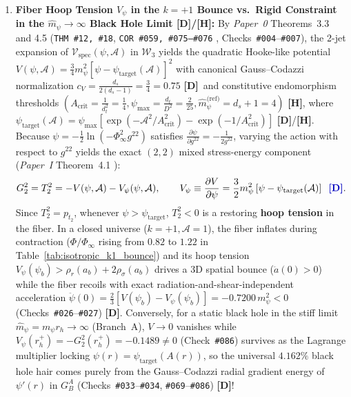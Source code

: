 \documentclass[11pt,a4paper]{article}
\newcommand{\catD}{\textbf{\textcolor{blue!75!black}{[D]}}}
\newcommand{\catH}{\textbf{\textcolor{orange!85!black}{[H]}}}
\theoremstyle{plain}
\theoremstyle{definition}
\theoremstyle{remark}
\numberwithin{equation}{section}
\begin{document}
\begin{enumerate}
  \item \textbf{Fiber Hoop Tension $V_{\psi}$ in the $k = +1$ Bounce vs.\ Rigid Constraint in the $\hat{m}_{\psi} \to \infty$ Black Hole Limit \catD/\catH:} By \textit{Paper~0} Theorems~3.3 and 4.5 (\texttt{THM \#12, \#18}, \texttt{COR \#059, \#075--\#076} \cite{jimenez2026_p0}, Checks~\texttt{\#004}--\texttt{\#007}), the 2-jet expansion of $\mathcal{V}_{\text{spec}}(\psi, \mathcal{A})$ in $\mathcal{W}_3$ yields the quadratic Hooke-like potential $V(\psi, \mathcal{A}) = \frac{3}{4}m_{\psi}^2[\psi - \psi_{\text{target}}(\mathcal{A})]^2$ with canonical Gauss--Codazzi normalization $c_V = \frac{d_s}{2(d_s-1)} = \frac{3}{4} = 0.75$ \catD\ and constitutive endomorphism thresholds $(A_{\text{crit}} = \frac{1}{d_t^2} = \frac{1}{4}, \psi_{\max} = \frac{d_t}{D^2} = \frac{2}{25}, \hat{m}_{\psi}^{\text{(ref)}} = d_s + 1 = 4)$ \catH, where $\psi_{\text{target}}(\mathcal{A}) = \psi_{\max}[\exp(-\mathcal{A}^2/A_{\text{crit}}^2) - \exp(-1/A_{\text{crit}}^2)]$ \catD/\catH. Because $\psi = -\frac{1}{2}\ln(-\Phi_{\infty}^2 g^{22})$ satisfies $\frac{\partial\psi}{\partial g^{22}} = -\frac{1}{2g^{22}}$, varying the action with respect to $g^{22}$ yields the exact $(2,2)$ mixed stress-energy component (\textit{Paper~I} Theorem~4.1 \cite{jimenez2026a}):
  \begin{equation}
    G^2_2 = T^2_2 = -V(\psi, \mathcal{A}) - V_{\psi}(\psi, \mathcal{A}), \qquad V_{\psi} \equiv \frac{\partial V}{\partial\psi} = \frac{3}{2}m_{\psi}^2\left[\psi - \psi_{\text{target}}(\mathcal{A})\right] \;\;\catD.
    \label{eq:exact_G22_T22_hoop_tension}
  \end{equation}
  Since $T^2_2 = p_{t_2}$, whenever $\psi > \psi_{\text{target}}$, $T^2_2 < 0$ is a restoring \textbf{hoop tension} in the fiber. In a closed universe ($k = +1, \mathcal{A} = 1$), the fiber inflates during contraction ($\Phi/\Phi_{\infty}$ rising from $0.82$ to $1.22$ in Table~\ref{tab:isotropic_k1_bounce}) and its hoop tension $V_{\psi}(\psi_b) > \rho_r(a_b) + 2\rho_{\sigma}(a_b)$ drives a 3D spatial bounce ($\ddot{a}(0) > 0$) while the fiber recoils with exact radiation-and-shear-independent acceleration $\ddot{\psi}(0) = \frac{2}{3}[V(\psi_b) - V_{\psi}(\psi_b)] = -0.7200\,m_{\psi}^2 < 0$ (Checks~\texttt{\#026}--\texttt{\#027}) \catD. Conversely, for a static black hole in the stiff limit $\hat{m}_{\psi} = m_{\psi}r_h \to \infty$ (Branch~A), $V \to 0$ vanishes while $V_{\psi}(r_h^+) = -G^2_2(r_h^+) = -0.1489 \neq 0$ (Check~\texttt{\#086}) survives as the Lagrange multiplier locking $\psi(r) = \psi_{\text{target}}(A(r))$, so the universal $4.162\%$ black hole hair comes purely from the Gauss--Codazzi radial gradient energy of $\psi'(r)$ in $G^A_B$ (Checks~\texttt{\#033}--\texttt{\#034}, \texttt{\#069}--\texttt{\#086}) \catD!
\end{enumerate}
\end{document}
